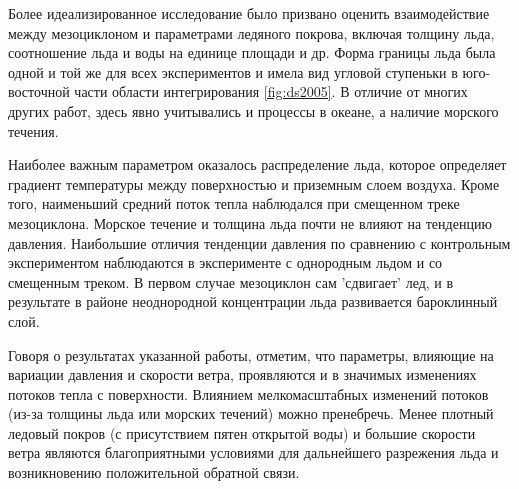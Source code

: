 Более идеализированное исследование \citep{DiererSchluenzen2005} было призвано оценить взаимодействие между мезоциклоном и  параметрами ледяного покрова, включая толщину льда, соотношение льда и воды на единице площади и др. Форма границы льда была одной и той же для всех экспериментов и имела вид угловой ступеньки в юго-восточной части области интегрирования \ref{fig:ds2005}. В отличие от многих других работ, здесь явно учитывались и процессы в океане, а наличие морского течения.
 
Наиболее важным параметром оказалось распределение льда, которое определяет градиент температуры между поверхностью и приземным слоем воздуха. Кроме того, наименьший средний поток тепла наблюдался при смещенном треке мезоциклона. Морское течение и толщина льда почти не влияют на тенденцию давления. Наибольшие отличия тенденции давления по сравнению с контрольным экспериментом наблюдаются в эксперименте с однородным льдом и со смещенным треком. В первом случае мезоциклон сам 'сдвигает' лед, и в результате в районе неоднородной концентрации льда развивается бароклинный слой.

Говоря о результатах указанной работы, отметим, что параметры, влияющие на вариации давления и скорости ветра, проявляются и в значимых изменениях потоков тепла с поверхности. Влиянием мелкомасштабных изменений потоков (из-за толщины льда или морских течений) можно пренебречь. Менее плотный ледовый покров (с присутствием пятен открытой воды) и большие скорости ветра являются благоприятными условиями для дальнейшего разрежения льда и возникновению положительной обратной связи.

%
%
%